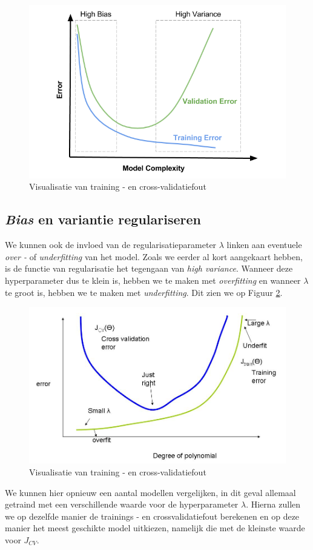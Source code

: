 \begin{figure}[h]
	\centering
	\includegraphics[width=0.65\linewidth]{images/18-error-plot.png}
	\caption{Visualisatie van training - en cross-validatiefout}
	\label{fig:error-plot}
\end{figure}

\subsection{\textit{Bias} en variantie regulariseren}

We kunnen ook de invloed van de regularisatieparameter $\lambda$ linken aan eventuele \textit{over -} of \textit{underfitting} van het model. Zoals we eerder al kort aangekaart hebben, is de functie van regularisatie het tegengaan van \textit{high variance}. Wanneer deze hyperparameter dus te klein is, hebben we te maken met \textit{overfitting} en wanneer $\lambda$ te groot is, hebben we te maken met \textit{underfitting}. Dit zien we op Figuur \ref{fig:error-plot-lambda}. 

\begin{figure}[h]
	\centering
	\includegraphics[width=0.65\linewidth]{images/19-error-plot-lambda.png}
	\caption{Visualisatie van training - en cross-validatiefout}
	\label{fig:error-plot-lambda}
\end{figure}
\noindent
We kunnen hier opnieuw een aantal modellen vergelijken, in dit geval allemaal getraind met een verschillende waarde voor de hyperparameter $\lambda$. Hierna zullen we op dezelfde manier de trainings - en crossvalidatiefout berekenen en op deze manier het meest geschikte model uitkiezen, namelijk die met de kleinste waarde voor $J_{CV}$. 

